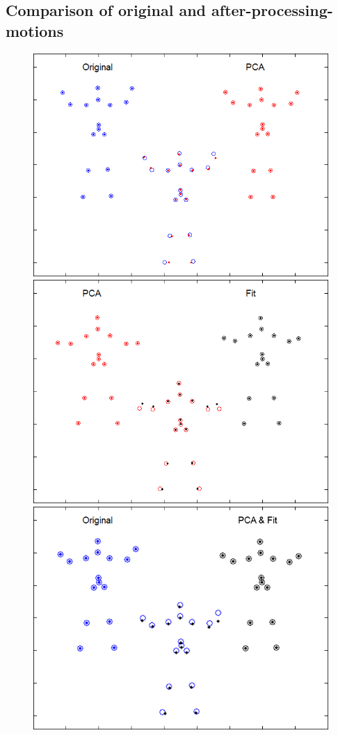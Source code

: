 \documentclass[a4paper]{article}
\begin{document}
\subsection{Comparison of original and after-processing-motions}

\begin{figure}
		\centering
		\includegraphics[height=0.3\textheight]{comparison_Original_PCA.png}
		\includegraphics[height=0.3\textheight]{comparison_PCA_Fit.png}
		\includegraphics[height=0.3\textheight]{comparison_alles.png}

\end{figure}
\end{document}
